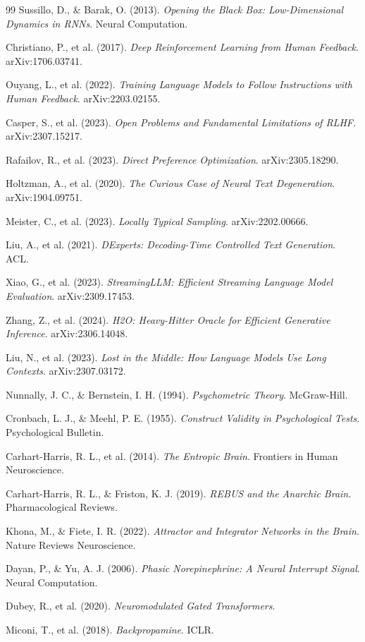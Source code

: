 \documentclass[10pt, twocolumn]{article}
\begin{document}
\begin{thebibliography}{99}
Sussillo, D., \& Barak, O. (2013). \textit{Opening the Black Box: Low-Dimensional Dynamics in RNNs}. Neural Computation.

Christiano, P., et al. (2017). \textit{Deep Reinforcement Learning from Human Feedback}. arXiv:1706.03741.

Ouyang, L., et al. (2022). \textit{Training Language Models to Follow Instructions with Human Feedback}. arXiv:2203.02155.

Casper, S., et al. (2023). \textit{Open Problems and Fundamental Limitations of RLHF}. arXiv:2307.15217.

Rafailov, R., et al. (2023). \textit{Direct Preference Optimization}. arXiv:2305.18290.

Holtzman, A., et al. (2020). \textit{The Curious Case of Neural Text Degeneration}. arXiv:1904.09751.

Meister, C., et al. (2023). \textit{Locally Typical Sampling}. arXiv:2202.00666.

Liu, A., et al. (2021). \textit{DExperts: Decoding-Time Controlled Text Generation}. ACL.

Xiao, G., et al. (2023). \textit{StreamingLLM: Efficient Streaming Language Model Evaluation}. arXiv:2309.17453.

Zhang, Z., et al. (2024). \textit{H2O: Heavy-Hitter Oracle for Efficient Generative Inference}. arXiv:2306.14048.

Liu, N., et al. (2023). \textit{Lost in the Middle: How Language Models Use Long Contexts}. arXiv:2307.03172.

Nunnally, J. C., \& Bernstein, I. H. (1994). \textit{Psychometric Theory}. McGraw-Hill.

Cronbach, L. J., \& Meehl, P. E. (1955). \textit{Construct Validity in Psychological Tests}. Psychological Bulletin.

Carhart-Harris, R. L., et al. (2014). \textit{The Entropic Brain}. Frontiers in Human Neuroscience.

Carhart-Harris, R. L., \& Friston, K. J. (2019). \textit{REBUS and the Anarchic Brain}. Pharmacological Reviews.

Khona, M., \& Fiete, I. R. (2022). \textit{Attractor and Integrator Networks in the Brain}. Nature Reviews Neuroscience.

Dayan, P., \& Yu, A. J. (2006). \textit{Phasic Norepinephrine: A Neural Interrupt Signal}. Neural Computation.

Dubey, R., et al. (2020). \textit{Neuromodulated Gated Transformers}.

Miconi, T., et al. (2018). \textit{Backpropamine}. ICLR.

\end{thebibliography}
\end{document}
